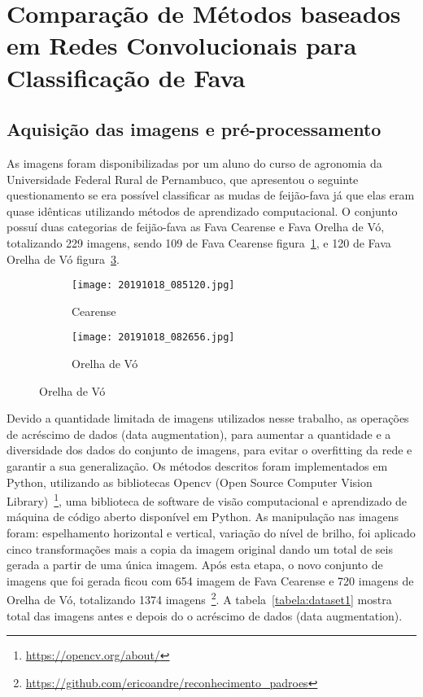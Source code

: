 \section{Comparação de Métodos baseados em Redes Convolucionais para Classificação de Fava}

\subsection{Aquisição das imagens e pré-processamento}

As imagens foram disponibilizadas por um aluno do curso de agronomia da Universidade Federal Rural de Pernambuco, que apresentou o seguinte questionamento se era possível classificar as mudas de feijão-fava já que elas eram quase idênticas utilizando métodos de aprendizado computacional. O conjunto possuí duas categorias de feijão-fava as Fava Cearense e Fava Orelha de Vó, totalizando 229 imagens, sendo 109 de Fava Cearense figura~\ref{fig:fava_cearens}, e 120 de Fava Orelha de Vó figura~\ref{fig:fava_Orelha_vo}.

\begin{figure}[H]
\centering
\begin{subfigure}[b]{0.3\textwidth}
\centering
\texttt{[image: 20191018\_085120.jpg]}
\caption{Cearense}
\label{fig:fava_cearens}
\end{subfigure}
\begin{subfigure}[b]{0.3\textwidth}
\centering
\texttt{[image: 20191018\_082656.jpg]}
\caption{Orelha de Vó}
\label{fig:fava_Orelha_vo}
\end{subfigure}
\end{figure}

Devido a quantidade limitada de imagens utilizados nesse trabalho, as operações de acréscimo de dados (data augmentation), para aumentar a quantidade e a diversidade dos dados do conjunto de imagens, para evitar o overfitting da rede e garantir a sua generalização. Os métodos descritos foram implementados em Python, utilizando as bibliotecas Opencv (Open Source Computer Vision Library)~\footnote{ \url{https://opencv.org/about/}}, uma biblioteca de software de visão computacional e aprendizado de máquina de código aberto disponível em Python. As manipulação nas imagens foram: espelhamento horizontal e vertical, variação do nível de brilho, foi aplicado cinco transformações mais a copia da imagem original dando um total de seis gerada a partir de uma única imagem. Após esta etapa, o novo conjunto de imagens que foi gerada ficou com 654 imagem de Fava Cearense e 720 imagens de Orelha de Vó, totalizando 1374 imagens~\footnote{  \url{https://github.com/ericoandre/reconhecimento_padroes}}. A tabela~\ref{tabela:dataset1} mostra total das imagens antes e depois do o acréscimo de dados (data augmentation).

